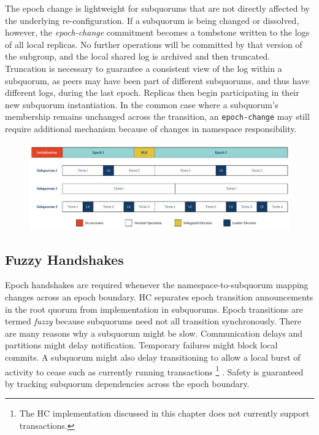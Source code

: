 The epoch change is lightweight for subquorums that are not directly affected by the underlying re-configuration.
If a subquorum is being changed or dissolved, however, the \emph{epoch-change} commitment becomes a tombstone written to the logs of all local replicas.
No further operations will be committed by that version of the subgroup, and the local shared log is archived and then truncated.
Truncation is necessary to guarantee a consistent view of the log within a subquorum, as peers may have been part of different subquorums, and thus have different logs, during the last epoch.
Replicas then begin participating in their new subquorum instantiation.
In the common case where a subquorum's membership remains unchanged across the transition, an \texttt{epoch-change} may still require additional mechanism because of changes in namespace responsibility.

\begin{landscape}
\begin{figure}
    \begin{center}
        \includegraphics[width=8.2in]{figures/ch03_epochs_terms.pdf}
    \end{center}
    \renewcommand{\baselinestretch}{1}
    \small\normalsize

    \begin{quote}
        \caption[Ordering of Epochs and Terms in Root and Subquorums]{}
        \label{fig:ch03_epochs_terms}
    \end{quote}
\end{figure}
\renewcommand{\baselinestretch}{2}
\small\normalsize
\end{landscape}

\subsection{Fuzzy Handshakes}
\label{ch03_fuzzy_transitions}

Epoch handshakes are required whenever the namespace-to-subquorum mapping changes across an epoch boundary.
HC separates epoch transition announcements in the root quorum from implementation in subquorums.
Epoch transitions are termed \emph{fuzzy} because subquorums need not all transition synchronously.
There are many reasons why a subquorum might be slow.
Communication delays and partitions might delay notification.
Temporary failures might block local commits.
A subquorum might also delay transitioning to allow a local burst of activity to cease such as currently running transactions\renewcommand{\baselinestretch}{1} \small\footnotesize\footnote{The HC implementation discussed in this chapter does not currently support transactions.}\renewcommand{\baselinestretch}{2} \small\normalsize.
Safety is guaranteed by tracking subquorum dependencies across the epoch boundary.

